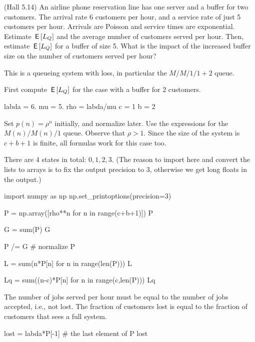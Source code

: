 \begin{exercise}
  (Hall 5.14) An airline phone reservation line has one server and a
  buffer for two customers. The arrival rate 6 customers per hour, and
  a service rate of just 5 customers per hour. Arrivals are Poisson and service times are exponential. 
 Estimate $\,\mathsf{E}\left[L_Q\right]$ and the average number of customers served per hour. Then, estimate $\,\mathsf{E}\left[L_Q\right]$ for a buffer of size 5. What is the impact of the increased buffer size on the number of customers served per hour?
  \begin{hint}
This is a queueing system with loss, in particular the $M/M/1/1+2$ queue.
  \end{hint}
    \begin{solution}
First compute $\,\mathsf{E}\left[L_Q\right]$ for the case with a buffer for $2$ customers.

\begin{pyconsole}
labda = 6.
mu = 5.
rho = labda/mu
c = 1
b = 2
\end{pyconsole} 

Set $p(n) = \rho^n$ initially, and normalize later. Use the
expressions for the $M(n)/M(n)/1$ queue.  Observe that $\rho>1$. Since
the size of the system is $c+b+1$ is finite, all formulas work for
this case too.


There are 4 states in total: $0,1,2,3$. (The reason to import  here and convert the lists to arrays is to fix the output precision to 3, otherwise we get long floats in the output.)

\begin{pyconsole}
import numpy as np
np.set_printoptions(precision=3)

P = np.array([rho**n for n in range(c+b+1)])
P

G = sum(P)
G

P /= G # normalize
P
\end{pyconsole} 

\begin{pyconsole}
L = sum(n*P[n] for n in range(len(P)))
L

Lq = sum((n-c)*P[n] for n in range(c,len(P)))
Lq
\end{pyconsole} 


The number of jobs served per hour must be equal to the number of jobs
accepted, i.e., not lost. The fraction of customers lost is equal to
the fraction of customers that sees a full system.

\begin{pyconsole}
lost = labda*P[-1] # the last element of P
lost


\end{pyconsole}
\end{solution}
\end{exercise}
